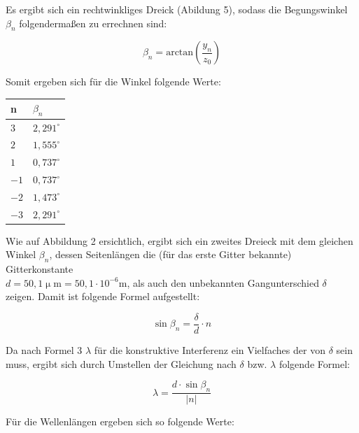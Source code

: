 \documentclass[12pt,a4paper,titlepage,headinclude,bibtotoc]{scrartcl}
\begin{document}
Es ergibt sich ein rechtwinkliges Dreick (Abildung 5), sodass die Begungswinkel $\beta_n$ folgendermaßen zu errechnen sind:

\begin{equation}
\beta_n = \mathrm {arctan} \left(\frac{y_n}{z_0}\right)
\end{equation}

\par

\vspace{2cm}

Somit ergeben sich für die Winkel folgende Werte: 

\begin{table} [h]
\centering
\begin{tabular}{|p{4 cm}||p{4 cm}|}
        \hline
		n& $\beta_n$\\
         \hline 
         $3$ & $2,291^\circ$  \\
         \hline
         $2$ & $1,555^\circ$\\
         \hline
         $1$ & $0,737^\circ$ \\
         \hline
         $-1$ & $0,737^\circ$ \\
         \hline
         $-2$ & $1,473^\circ$ \\
         \hline             
         $-3$ & $2,291^\circ$ \\
         \hline
\end{tabular}
\end{table}

Wie auf Abbildung 2 ersichtlich, ergibt sich ein zweites Dreieck mit dem gleichen Winkel $\beta_n$, dessen Seitenlängen die (für das erste Gitter bekannte) Gitterkonstante\\ $d= 50,1 \upmu \mathrm{m} =50,1\cdot10^{-6} \mathrm{m}$, als auch den unbekannten Gangunterschied $\delta$ zeigen. Damit ist folgende Formel aufgestellt:

\begin{equation}
\sin{\beta_n}=\frac{\delta}{d}\cdot n
\end{equation}

Da nach Formel 3 $\lambda$ für die konstruktive Interferenz ein Vielfaches der von $\delta$ sein muss, ergibt sich durch Umstellen der Gleichung nach $\delta$ bzw. $\lambda$ folgende Formel:

\begin{equation}
\lambda = \frac{d\cdot \sin\beta_n}{|n|}
\end{equation}

Für die Wellenlängen ergeben sich so folgende Werte:
\end{document}
